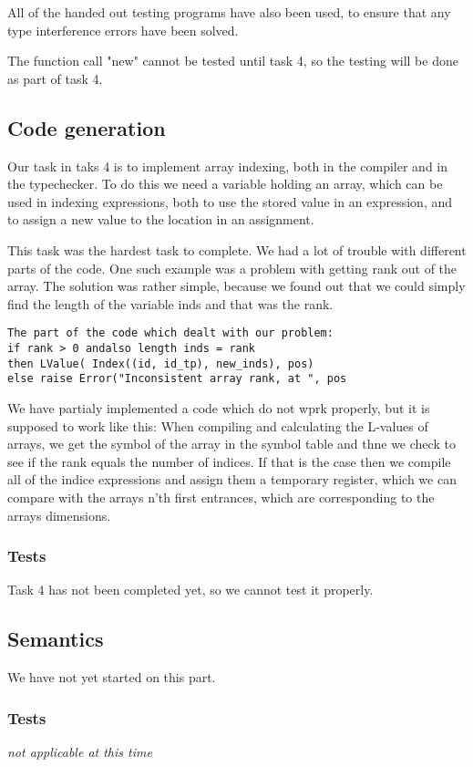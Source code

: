 \documentclass[11pt]{article}
\begin{document}
All of the handed out testing programs have also been used, to ensure that any type interference errors have been solved.

The function call "new" cannot be tested until task 4, so the testing will be done as part of task 4.

\subsection*{Code generation}
Our task in taks 4 is to implement array indexing, both in the compiler and in the typechecker. To do this we need a variable holding an array, which can be used in indexing expressions, both to use the stored value in an expression, and to assign a new value to the location in an assignment.

This task was the hardest task to complete. We had a lot of trouble with different parts of the code. One such example was a problem with getting rank out of the array. The solution was rather simple, because we found out that we could simply find the length of the variable inds and that was the rank.

\begin{lstlisting}
The part of the code which dealt with our problem:
if rank > 0 andalso length inds = rank
then LValue( Index((id, id_tp), new_inds), pos)
else raise Error("Inconsistent array rank, at ", pos
\end{lstlisting}

We have partialy implemented a code which do not wprk properly, but it is supposed to work like this:
When compiling and calculating the L-values of arrays, we get the symbol of the array in the symbol table and thne we check to see if the rank equals the number of indices. If that is the case then we compile all of the indice expressions and assign them a temporary register, which we can compare with the arrays n'th first entrances, which are corresponding to the arrays dimensions.

\subsubsection*{Tests}%
Task 4 has not been completed yet, so we cannot test it properly.

\subsection*{Semantics}
We have not yet started on this part.

\subsubsection*{Tests}
{\it not applicable at this time}%
\end{document}
